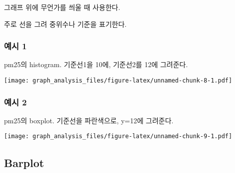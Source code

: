 \documentclass[
]{article}
\newenvironment{Shaded}{\begin{snugshade}}{\end{snugshade}}
\newcommand{\AttributeTok}[1]{\textcolor[rgb]{0.13,0.29,0.53}{#1}}
\newcommand{\CommentTok}[1]{\textcolor[rgb]{0.56,0.35,0.01}{\textit{#1}}}
\newcommand{\DecValTok}[1]{\textcolor[rgb]{0.00,0.00,0.81}{#1}}
\newcommand{\FunctionTok}[1]{\textcolor[rgb]{0.13,0.29,0.53}{\textbf{#1}}}
\newcommand{\NormalTok}[1]{#1}
\newcommand{\SpecialCharTok}[1]{\textcolor[rgb]{0.81,0.36,0.00}{\textbf{#1}}}
\newcommand{\StringTok}[1]{\textcolor[rgb]{0.31,0.60,0.02}{#1}}
\begin{document}
그래프 위에 무언가를 씌울 때 사용한다.

주로 선을 그려 중위수나 기준을 표기한다.

\subsubsection{예시 1}\label{uxc608uxc2dc-1}

pm25의 histogram. 기준선1을 10에, 기준선2를 12에 그려준다.

\begin{Shaded}
\end{Shaded}

\texttt{[image: graph\_analysis\_files/figure-latex/unnamed-chunk-8-1.pdf]}

\subsubsection{예시 2}\label{uxc608uxc2dc-2}

pm25의 boxplot. 기준선을 파란색으로, y=12에 그려준다.

\begin{Shaded}
\end{Shaded}

\texttt{[image: graph\_analysis\_files/figure-latex/unnamed-chunk-9-1.pdf]}

\subsection{Barplot}\label{barplot}
\end{document}

